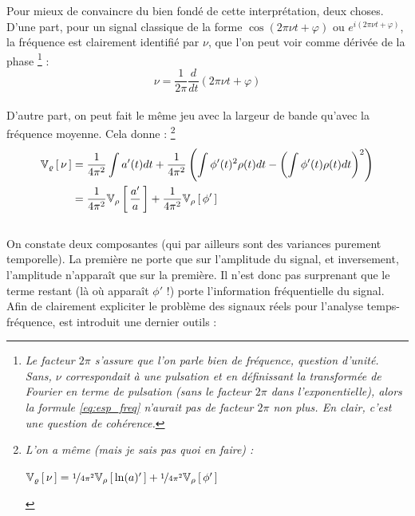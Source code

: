 Pour mieux de convaincre du bien fondé de cette interprétation, deux choses.
\\
D'une part, pour un signal classique de la forme $\cos(2\pi\nu t+\varphi)$ ou $e^{i(2\pi\nu t + \varphi)}$, la fréquence est clairement identifié par $\nu$, que l'on peut voir comme dérivée de la phase
	\footnote{\itshape 
			Le facteur $2\pi$ s'assure que l'on parle bien de fréquence, question d'unité. Sans, $\nu$ correspondait à une pulsation et en définissant la transformée de Fourier en terme de pulsation (\ie sans le facteur $2\pi$ dans l'exponentielle), alors la formule \eqref{eq:esp_freq} n'aurait pas de facteur $2\pi$ non plus. En clair, c'est une question de cohérence.} :
\[\nu = \frac{1}{2\pi}\frac{d}{dt}(2\pi\nu t+\varphi)\]
\\
D'autre part, on peut fait le même jeu avec la largeur de bande qu'avec la fréquence moyenne. Cela donne :
	\footnote{\itshape 
		L'on a même (mais je sais pas quoi en faire) : 
		\begin{center}
			$\var[\varrho]{\nu} =  \nicefrac{1}{4\pi^2}\var[\rho]{\ln(a)'} + \nicefrac{1}{4\pi^2} \var[\rho]{\phi'}$
		\end{center}}
\begin{equation}\label{eq:bandwidth_cohen}
	\begin{aligned}
		\var[\varrho]{\nu} &= \frac{1}{4\pi^2} \int a'(t) dt + \frac{1}{4\pi^2}\left(\int \phi'(t)^2 \rho(t) dt - \left(\int \phi'(t) \rho(t) dt \right)^2 \right) \\
		&= \frac{1}{4\pi^2}\var[\rho]{\frac{a'}{a}} +\frac{1}{4\pi^2} \var[\rho]{\phi'}
	\end{aligned}
\end{equation}
\\
On constate deux composantes (qui par ailleurs sont des variances purement temporelle). La première ne porte que sur l'amplitude du signal, et inversement, l'amplitude n'apparaît que sur la première. Il n'est donc pas surprenant que le terme restant (là où apparaît $\phi'$ !) porte l'information fréquentielle du signal.
\\

Afin de clairement expliciter le problème des signaux réels pour l'analyse temps-fréquence, est introduit une dernier outils :
\\

